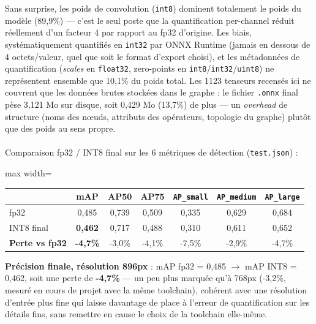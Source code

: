 \documentclass[11pt,a4paper]{article}
\begin{document}
    Sans surprise, les poids de convolution (\texttt{int8}) dominent
    totalement le poids du modèle (89,9\%) --- c'est le seul poste que la
    quantification per-channel réduit réellement d'un facteur 4 par
    rapport au fp32 d'origine. Les biais, systématiquement quantifiés en
    \texttt{int32} par ONNX Runtime (jamais en dessous de 4 octets/valeur,
    quel que soit le format d'export choisi), et les métadonnées de
    quantification (\emph{scales} en \texttt{float32}, zero-points en
    \texttt{int8}/\texttt{int32}/\texttt{uint8}) ne représentent ensemble
    que 10,1\% du poids total. Les 1123 tenseurs recensés ici ne couvrent
    que les données brutes stockées dans le graphe : le fichier
    \texttt{.onnx} final pèse 3,121 Mo sur disque, soit 0,429 Mo (13,7\%)
    de plus --- un \emph{overhead} de structure (noms des nœuds, attributs
    des opérateurs, topologie du graphe) plutôt que des poids au sens
    propre.
    \\\\
    Comparaison fp32 / INT8 final sur les 6 métriques de détection
    (\texttt{test.json}) :
    
    \begin{table}[!htbp]
    \centering
    \small
    \begin{adjustbox}{max width=\linewidth}
    \begin{tabular}{@{}lcccccc@{}}
    \toprule
    & \textbf{mAP} & \textbf{AP50} & \textbf{AP75} & \textbf{\texttt{AP\_small}} & \textbf{\texttt{AP\_medium}} & \textbf{\texttt{AP\_large}} \\
    \midrule
    fp32 & 0,485 & 0,739 & 0,509 & 0,335 & 0,629 & 0,684 \\
    INT8 final & \textbf{0,462} & 0,717 & 0,488 & 0,310 & 0,611 & 0,652 \\
    \midrule
    \textbf{Perte vs fp32} & \textbf{-4,7\%} & -3,0\% & -4,1\% & -7,5\% & -2,9\% & -4,7\% \\
    \bottomrule
    \end{tabular}
    \end{adjustbox}
    \end{table}
    
    \textbf{Précision finale, résolution 896px} : mAP fp32 = 0,485 $\to$
    mAP INT8 = 0,462, soit une perte de \textbf{-4,7\%} --- un peu plus
    marquée qu'à 768px (-3,2\%, mesuré en cours de projet avec la même
    toolchain), cohérent avec une résolution d'entrée plus fine qui laisse
    davantage de place à l'erreur de quantification sur les détails fins,
    sans remettre en cause le choix de la toolchain elle-même.
    
\end{document}
